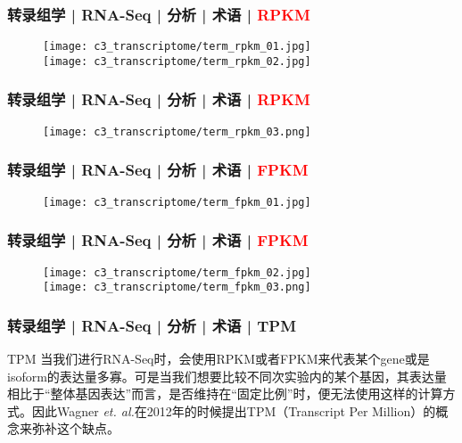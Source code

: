 \begin{frame}
  \frametitle{转录组学 | RNA-Seq | 分析 | 术语 | \textcolor{red}{RPKM}}
  \begin{figure}
    \centering
    \texttt{[image: c3\_transcriptome/term\_rpkm\_01.jpg]}\\
    \vspace{1em}
    \texttt{[image: c3\_transcriptome/term\_rpkm\_02.jpg]}
  \end{figure}
\end{frame}

\begin{frame}
  \frametitle{转录组学 | RNA-Seq | 分析 | 术语 | \textcolor{red}{RPKM}}
  \begin{figure}
    \centering
    \texttt{[image: c3\_transcriptome/term\_rpkm\_03.png]}
  \end{figure}
\end{frame}

\begin{frame}
  \frametitle{转录组学 | RNA-Seq | 分析 | 术语 | \textcolor{red}{FPKM}}
  \begin{figure}
    \centering
    \texttt{[image: c3\_transcriptome/term\_fpkm\_01.jpg]}
  \end{figure}
\end{frame}

\begin{frame}
  \frametitle{转录组学 | RNA-Seq | 分析 | 术语 | \textcolor{red}{FPKM}}
  \begin{figure}
    \centering
    \texttt{[image: c3\_transcriptome/term\_fpkm\_02.jpg]}\\
    \vspace{1em}
    \texttt{[image: c3\_transcriptome/term\_fpkm\_03.png]}
  \end{figure}
\end{frame}

\begin{frame}
  \frametitle{转录组学 | RNA-Seq | 分析 | 术语 | TPM}
  \begin{block}{TPM}
    当我们进行RNA-Seq时，会使用RPKM或者FPKM来代表某个gene或是isoform的表达量多寡。可是当我们想要比较不同次实验内的某个基因，其表达量相比于“整体基因表达”而言，是否维持在“固定比例”时，便无法使用这样的计算方式。因此Wagner \textit{et. al.}在2012年的时候提出TPM（Transcript Per Million）的概念来弥补这个缺点。
  \end{block}
\end{frame}

